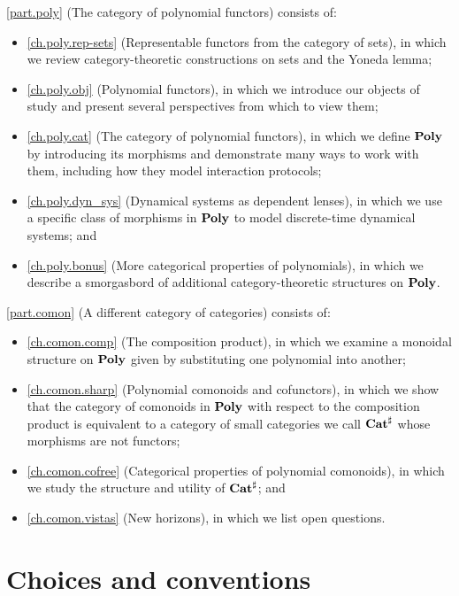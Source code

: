 \documentclass[Book-Poly]{subfiles}
\begin{document}
\bigskip

\cref{part.poly} (The category of polynomial functors) consists of:
\begin{itemize}
  \item \cref{ch.poly.rep-sets} (Representable functors from the category of sets), in which we review category-theoretic constructions on sets and the Yoneda lemma;
  \item \cref{ch.poly.obj} (Polynomial functors), in which we introduce our objects of study and present several perspectives from which to view them;
  \item \cref{ch.poly.cat} (The category of polynomial functors), in which we define $\mathbf{Poly}$ by introducing its morphisms and demonstrate many ways to work with them, including how they model interaction protocols;
  \item \cref{ch.poly.dyn_sys} (Dynamical systems as dependent lenses), in which we use a specific class of morphisms in $\mathbf{Poly}$ to model discrete-time dynamical systems; and
  \item \cref{ch.poly.bonus} (More categorical properties of polynomials), in which we describe a smorgasbord of additional category-theoretic structures on $\mathbf{Poly}$.
\end{itemize}
\bigskip

\cref{part.comon} (A different category of categories) consists of:
\begin{itemize}
  \item \cref{ch.comon.comp} (The composition product), in which we examine a monoidal structure on $\mathbf{Poly}$ given by substituting one polynomial into another;
  \item \cref{ch.comon.sharp} (Polynomial comonoids and cofunctors), in which we show that the category of comonoids in $\mathbf{Poly}$ with respect to the composition product is equivalent to a category of small categories we call $\mathbf{Cat}^\sharp$ whose morphisms are not functors;
  \item \cref{ch.comon.cofree} (Categorical properties of polynomial comonoids), in which we study the structure and utility of $\mathbf{Cat}^\sharp$; and
  \item \cref{ch.comon.vistas} (New horizons), in which we list open questions.
\end{itemize}

\section{Choices and conventions}\label{sec.choices}
\end{document}
